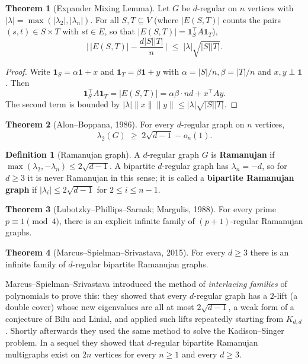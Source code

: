 \documentclass{article}
\theoremstyle{definition}
\newtheorem{theorem}{Theorem}
\newtheorem{definition}{Definition}
\begin{document}
\begin{theorem}[Expander Mixing Lemma]\label{thm:emixing}
Let $G$ be $d$-regular on $n$ vertices with
$|\lambda| = \max(|\lambda_2|, |\lambda_n|)$. For all $S, T \subseteq V$
(where $|E(S, T)|$ counts the pairs $(s, t) \in S \times T$ with $st \in E$,
so that $|E(S, T)| = \mathbf 1_S^\top A \mathbf 1_T$),
\[
  \Big|\, |E(S, T)| - \frac{d |S| |T|}{n} \,\Big|
  \;\le\; |\lambda|\sqrt{|S| |T|}.
\]
\end{theorem}

\begin{proof}
Write $\mathbf 1_S = \alpha \mathbf 1 + x$ and $\mathbf 1_T = \beta \mathbf 1 + y$
with $\alpha = |S|/n, \beta = |T|/n$ and $x, y \perp \mathbf 1$. Then
\[
  \mathbf 1_S^\top A \mathbf 1_T = |E(S, T)| = \alpha \beta \cdot n d + x^\top A y.
\]
The second term is bounded by $|\lambda| \|x\|\|y\| \le |\lambda| \sqrt{|S||T|}$.
\end{proof}

\begin{theorem}[Alon--Boppana, 1986]
For every $d$-regular graph on $n$ vertices,
\[
  \lambda_2(G) \;\ge\; 2\sqrt{d - 1} - o_n(1).
\]
\end{theorem}

\begin{definition}[Ramanujan graph]\label{def:ramanujan}
A $d$-regular graph $G$ is \textbf{Ramanujan} if
$\max(\lambda_2, -\lambda_n) \le 2\sqrt{d - 1}$.
A bipartite $d$-regular graph has $\lambda_n = -d$, so for $d \ge 3$ it is
never Ramanujan in this sense; it is called a \textbf{bipartite Ramanujan
graph} if $|\lambda_i| \le 2\sqrt{d - 1}$ for $2 \le i \le n - 1$.
\end{definition}

\begin{theorem}[Lubotzky--Phillips--Sarnak; Margulis, 1988]
For every prime $p \equiv 1 \pmod 4$, there is an explicit infinite
family of $(p + 1)$-regular Ramanujan graphs.
\end{theorem}

\begin{theorem}[Marcus--Spielman--Srivastava, 2015]
For every $d \ge 3$ there is an infinite family of $d$-regular
bipartite Ramanujan graphs.
\end{theorem}

Marcus--Spielman--Srivastava introduced the method of \emph{interlacing
families} of polynomials to prove this: they showed that every
$d$-regular graph has a $2$-lift (a double cover) whose new eigenvalues
are all at most $2\sqrt{d - 1}$, a weak form of a conjecture of Bilu and
Linial, and applied such lifts repeatedly starting from $K_{d,d}$. Shortly
afterwards they used the same method to solve the Kadison--Singer problem.
In a sequel they showed that $d$-regular bipartite Ramanujan multigraphs
exist on $2n$ vertices for every $n \ge 1$ and every $d \ge 3$.
\end{document}
